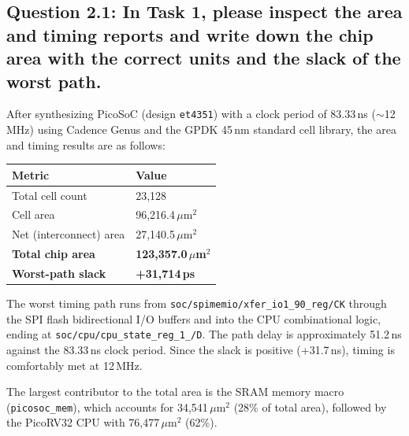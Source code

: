\documentclass{article}
\begin{document}
\subsection*{Question 2.1: In Task 1, please inspect the area and timing reports and write down the chip area with the correct units and the slack of the worst path.}

\begin{tcolorbox}[colback=white, colframe=black, width=\textwidth, title=Answer 2.1]

After synthesizing PicoSoC (design \texttt{et4351}) with a clock period of 83.33\,ns ($\sim$12\,MHz) using Cadence Genus and the GPDK 45\,nm standard cell library, the area and timing results are as follows:

\vspace{0.3cm}

\begin{tabular}{@{}ll@{}}
\toprule
\textbf{Metric} & \textbf{Value} \\
\midrule
Total cell count & 23{,}128 \\
Cell area & 96{,}216.4\,$\mu$m$^2$ \\
Net (interconnect) area & 27{,}140.5\,$\mu$m$^2$ \\
\textbf{Total chip area} & \textbf{123{,}357.0\,$\mu$m$^2$} \\
\midrule
\textbf{Worst-path slack} & \textbf{+31{,}714\,ps} \\
\bottomrule
\end{tabular}

\vspace{0.3cm}

The worst timing path runs from \texttt{soc/spimemio/xfer\_io1\_90\_reg/CK} through the SPI flash bidirectional I/O buffers and into the CPU combinational logic, ending at \texttt{soc/cpu/cpu\_state\_reg\_1\_/D}. The path delay is approximately 51.2\,ns against the 83.33\,ns clock period. Since the slack is positive (+31.7\,ns), timing is comfortably met at 12\,MHz.

The largest contributor to the total area is the SRAM memory macro (\texttt{picosoc\_mem}), which accounts for 34{,}541\,$\mu$m$^2$ (28\% of total area), followed by the PicoRV32 CPU with 76{,}477\,$\mu$m$^2$ (62\%).

\end{tcolorbox}

\newpage
\end{document}
